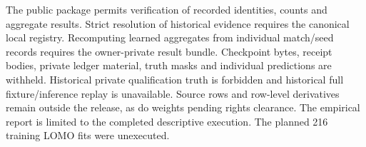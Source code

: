The public package permits verification of recorded identities, counts and aggregate results. Strict resolution of historical evidence requires the canonical local registry. Recomputing learned aggregates from individual match/seed records requires the owner-private result bundle. Checkpoint bytes, receipt bodies, private ledger material, truth masks and individual predictions are withheld. Historical private qualification truth is forbidden and historical full fixture/inference replay is unavailable. Source rows and row-level derivatives remain outside the release, as do weights pending rights clearance. The empirical report is limited to the completed descriptive execution. The planned 216 training LOMO fits were unexecuted.

